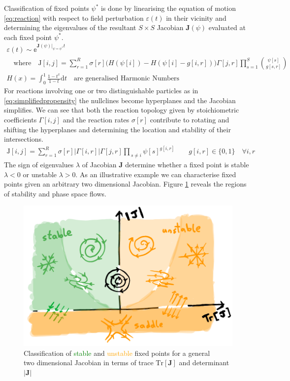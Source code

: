 Classification of fixed points $\psi^*$ is done by linearising the equation of motion
\eqref{eq:reaction} with respect to field perturbation $\varepsilon(t)$ in their vicinity
and determining the eigenvalues of the resultant $S\times S$ Jacobian $\mathbf{J}(\psi)$
evaluated at each fixed point $\psi^*$.
\begin{align}
	\varepsilon(t) \sim
	\mathbb{e}^{\mathbf{J}(\psi)|_{\psi=\psi^*}t}\qquad\qquad\qquad\qquad\qquad\qquad
	\\
	\quad\text{where}\quad
	\mathrm{J}[i,j]=
	\sum_{r=1}^R
	\sigma[r]
\bigg(H(\psi[i])-H(\psi[i]-g[i,r])\bigg)
	\Gamma[j,r]
		\prod_{s=1}^S{\psi[s] \choose g[s,r]}
	\\
	H(x)=\int_0^1\frac{1-t^x}{1-t}\mathrm{d}t\quad
	\text{are generalised Harmonic Numbers}\qquad
	\label{eq:linearstability}
\end{align}
For reactions involving one or two distinguishable particles as
in \eqref{eq:simplifiedpropensity} the nullclines become hyperplanes and the Jacobian
simplifies. We can see that both the reaction topology given by stoichiometric
coefficients $\Gamma[i,j]$ and the reaction rates $\sigma[r]$ contribute to
rotating and shifting the hyperplanes and determining the location and stability
of their intersections.
\begin{align}
	\mathrm{J}[i,j]=
	\sum_{r=1}^R
		\sigma[r]|\Gamma[i,r]|\Gamma[j,r]
		\prod_{\,s\neq i}
		\psi[s]^{g[i,r]}
		\qquad g[i,r]\in\{0,1\} \quad\forall i,r
	\label{eq:simplifiedjacobian}
\end{align}
The sign of eigenvalues $\lambda$ of Jacobian $\mathbf{J}$ determine whether a fixed point
is stable $\lambda<0$ or unstable $\lambda>0$. As an illustrative example we can characterise
fixed points given an arbitrary two dimensional Jacobian. Figure \ref{fig:stability} reveals
the regions of stability and phase space flows.
\begin{figure}[H]
\centering{}
\captionsetup{justification=centering}
\includegraphics[scale=0.35]{figures/stability}
\caption{Classification of \textcolor{Green}{stable} and \textcolor{orange}{unstable}
fixed points for a general \\two dimensional Jacobian in terms of trace $\mathrm{Tr}[\mathbf{J}]$ and
determinant $|\mathbf{J}|$}
\label{fig:stability}
\end{figure}
